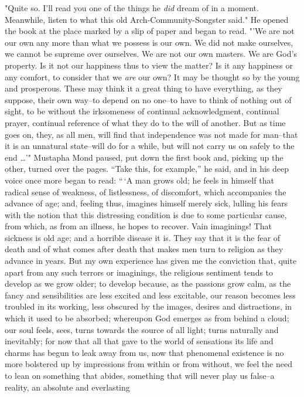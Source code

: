 \documentclass[12pt]{report}
\begin{document}
"Quite so. I'll read you one of the things he \emph{did} dream of in a
moment. Meanwhile, listen to what this old Arch-Community-Songster
said." He opened the book at the place marked by a slip of paper and
began to read. "'We are not our own any more than what we possess is our
own. We did not make ourselves, we cannot be supreme over ourselves. We
are not our own masters. We are God's property. Is it not our happiness
thus to view the matter? Is it any happiness or any comfort, to consider
that we \emph{are} our own? It may be thought so by the young and
prosperous. These may think it a great thing to have everything, as they
suppose, their own way--to depend on no one--to have to think of nothing
out of sight, to be without the irksomeness of continual acknowledgment,
continual prayer, continual reference of what they do to the will of
another. But as time goes on, they, as all men, will find that
independence was not made for man--that it is an unnatural state--will
do for a while, but will not carry us on safely to the end \ldots{}'"
Mustapha Mond paused, put down the first book and, picking up the other,
turned over the pages. ``Take this, for example,'' he said, and in his
deep voice once more began to read: ``\,`A man grows old; he feels in
himself that radical sense of weakness, of listlessness, of discomfort,
which accompanies the advance of age; and, feeling thus, imagines
himself merely sick, lulling his fears with the notion that this
distressing condition is due to some particular cause, from which, as
from an illness, he hopes to recover. Vain imaginings! That sickness is
old age; and a horrible disease it is. They say that it is the fear of
death and of what comes after death that makes men turn to religion as
they advance in years. But my own experience has given me the conviction
that, quite apart from any such terrors or imaginings, the religious
sentiment tends to develop as we grow older; to develop because, as the
passions grow calm, as the fancy and sensibilities are less excited and
less excitable, our reason becomes less troubled in its working, less
obscured by the images, desires and distractions, in which it used to be
absorbed; whereupon God emerges as from behind a cloud; our soul feels,
sees, turns towards the source of all light; turns naturally and
inevitably; for now that all that gave to the world of sensations its
life and charms has begun to leak away from us, now that phenomenal
existence is no more bolstered up by impressions from within or from
without, we feel the need to lean on something that abides, something
that will never play us false--a reality, an absolute and everlasting
\end{document}
